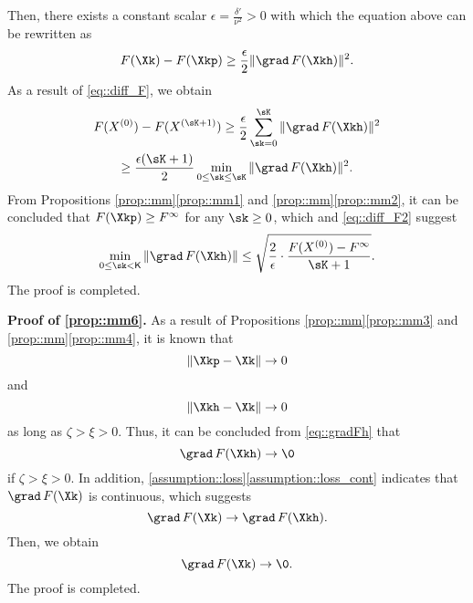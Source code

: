 Then, there exists a constant scalar $\epsilon =\frac{\delta'}{\nu^2}>0$ with which the equation above can be rewritten as
\begin{equation}\label{eq::diff_F}
F(\Xk)-F(\Xkp) \geq \frac{\epsilon}{2}\|\grad\, F(\Xkh)\|^2.
\end{equation}
As a result of \cref{eq::diff_F}, we obtain
\begin{multline}\label{eq::diff_F2}
F(X^{(0)}) - F(X^{(\sK+1)}) \geq \frac{\epsilon}{2} \sum_{\sk=0}^{\sK}\|\grad\, F(\Xkh)\|^2\\
\geq \frac{\epsilon(\sK+1)}{2}\min_{0\leq\sk\leq\sK}\|\grad\, F(\Xkh)\|^2.
\end{multline}
From Propositions \ref{prop::mm}\ref{prop::mm1} and \ref{prop::mm}\ref{prop::mm2}, it can be concluded that  $F(\Xkp) \geq F^\infty$ for any $\sk\geq0$, which and \cref{eq::diff_F2} suggest
\begin{equation}
	\nonumber
	\min\limits_{0\leq\sk< \mathsf{K}}\|\grad\, F(\Xkh)\|\leq \sqrt{\frac{2}{\epsilon}\cdot\dfrac{F(X^{(0)})-F^\infty}{{\sK+1}}}.
\end{equation}
The proof is completed.


\vspace{0.8em}
\noindent\textbf{Proof of \ref{prop::mm6}.\;} As a result of Propositions \ref{prop::mm}\ref{prop::mm3} and \ref{prop::mm}\ref{prop::mm4}, it is known that 
\begin{equation}
\nonumber
\|\Xkp-\Xk\|\rightarrow 0
\end{equation}
and
\begin{equation}
\nonumber
\|\Xkh-\Xk\|\rightarrow 0
\end{equation}
as long as $\zeta>\xi>0$. Thus, it can be concluded from \cref{eq::gradFh} that
$$\grad\,F(\Xkh)\rightarrow \0$$
if $\zeta>\xi>0$. In addition, \cref{assumption::loss}\ref{assumption::loss_cont} indicates that $\grad\,F(\Xk)$ is continuous, which suggests
$$\grad\, F(\Xk)\rightarrow \grad\, F(\Xkh).$$
Then, we obtain
$$\grad\, F(\Xk) \rightarrow \0. $$
The proof is completed.
